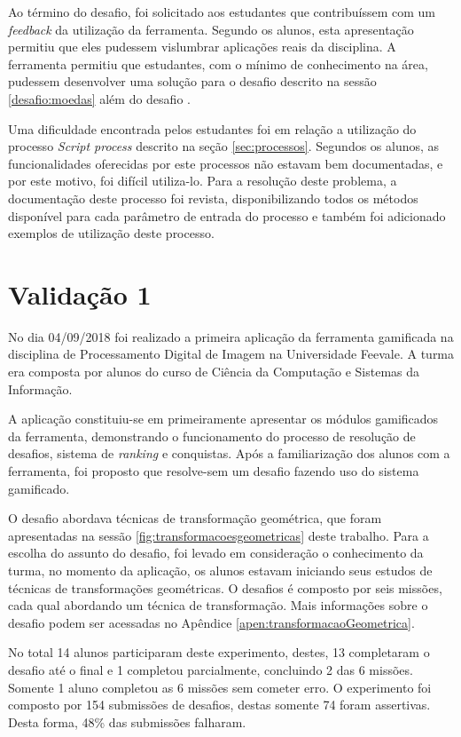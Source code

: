 \documentclass[
	12pt,				%
	oneside,			%
	a4paper,			%
	english,			%
	french,				%
	spanish,			%
	brazil,				%
	]{abntex2}
\begin{document}
Ao término do desafio, foi solicitado aos estudantes que contribuíssem com um \textit{feedback} da utilização da ferramenta. Segundo os alunos, esta apresentação permitiu que eles pudessem vislumbrar aplicações reais da disciplina. A ferramenta permitiu que estudantes, com o mínimo de conhecimento na área, pudessem desenvolver uma solução para o desafio descrito na sessão \ref{desafio:moedas} além do desafio \label{desafio:estatistica}.

Uma dificuldade encontrada pelos estudantes foi em relação a utilização do processo \textit{Script process} descrito na seção \ref{sec:processos}. Segundos os alunos, as funcionalidades oferecidas por este processos não estavam bem documentadas, e por este motivo, foi difícil utiliza-lo. Para a resolução deste problema, a documentação deste processo foi revista, disponibilizando todos os métodos disponível para cada parâmetro de entrada do processo e também foi adicionado exemplos de utilização deste processo.

\section{Validação 1}

No dia 04/09/2018 foi realizado a primeira aplicação da ferramenta gamificada na disciplina de Processamento Digital de Imagem na Universidade Feevale. A turma era composta por alunos do curso de Ciência da Computação e Sistemas da Informação.

A aplicação constituiu-se em primeiramente apresentar os módulos gamificados da ferramenta, demonstrando o funcionamento do processo de resolução de desafios, sistema de \textit{ranking} e conquistas. Após a familiarização dos alunos com a ferramenta, foi proposto que resolve-sem um desafio fazendo uso do sistema gamificado.

O desafio abordava técnicas de transformação geométrica, que foram apresentadas na sessão \ref{fig:transformacoesgeometricas} deste trabalho. Para a escolha do assunto do desafio, foi levado em consideração o conhecimento da turma, no momento da aplicação, os alunos estavam iniciando seus estudos de técnicas de transformações geométricas. O desafios é composto por seis missões, cada qual abordando um técnica de transformação. Mais informações sobre o desafio podem ser acessadas no Apêndice \ref{apen:transformacaoGeometrica}.

No total 14 alunos participaram deste experimento, destes, 13 completaram o desafio até o final e 1 completou parcialmente, concluindo 2 das 6 missões. Somente 1 aluno completou as 6 missões sem cometer erro. O experimento foi composto por 154 submissões de desafios, destas somente 74 foram assertivas. Desta forma, 48\% das submissões falharam.
\end{document}
